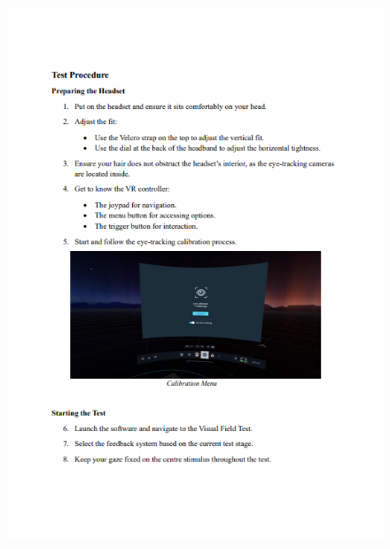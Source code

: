\documentclass{l4proj}
\begin{document}
\begin{appendices}
\begin{figure}
    \centering
    \includegraphics[width=1\linewidth]{images//VFT study/p3.png}
\end{figure}
\clearpage


\end{appendices}
\end{document}

